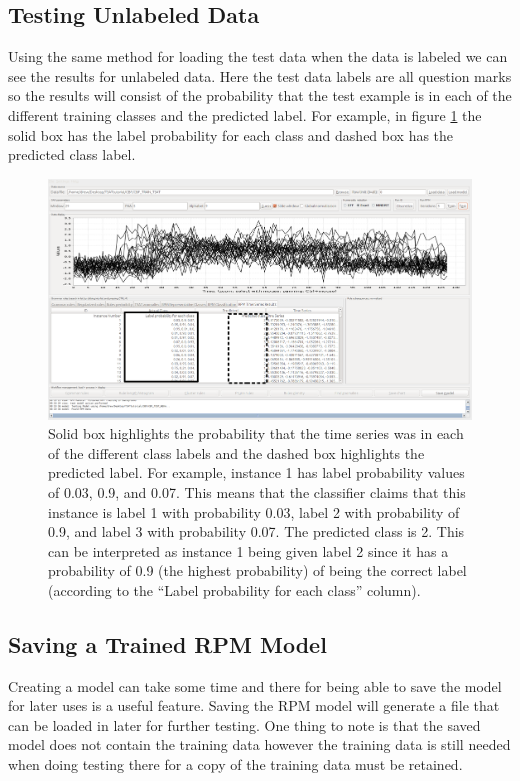 \documentclass[titlepage, letterpaper, 12pt]{article}
\begin{document}
\subsection{Testing Unlabeled Data}
Using the same method for loading the test data when the data is labeled we can see the results for unlabeled data.  Here the test data labels are all question marks so the results will consist of the probability that the test example is in each of the different training classes and the predicted label.  For example, in figure \ref{fig:TSAT-Results-Unknown-Test} the solid box has the label probability for each class and dashed box has the predicted class label.
\begin{figure}[H]
	\includegraphics[width=\textwidth]{RPMTimeSeriesResultsUnknown}
	\caption{Solid box highlights the probability that the time series was in each of the different class labels and the dashed box highlights the predicted label.  For example, instance 1 has label probability values of 0.03, 0.9, and 0.07.  This means that the classifier claims that this instance is label 1 with probability 0.03, label 2 with probability of 0.9, and label 3 with probability 0.07. The predicted class is 2.  This can be interpreted as instance 1 being given label 2 since it has a probability of 0.9 (the highest probability) of being the correct label (according to the ``Label probability for each class'' column).  }
	\label{fig:TSAT-Results-Unknown-Test}
\end{figure}

\subsection{Saving a Trained RPM Model}
\label{RPMSaving}
Creating a model can take some time and there for being able to save the model for later uses is a useful feature. Saving the RPM model will generate a file that can be loaded in later for further testing. One thing to note is that the saved model does not contain the training data however the training data is still needed when doing testing there for a copy of the training data must be retained.
\newpage
\end{document}
